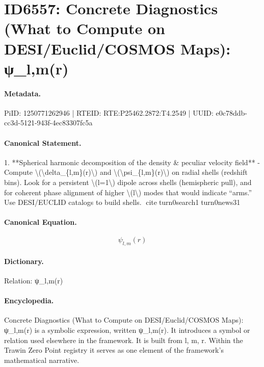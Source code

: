 \section*{ID6557: Concrete Diagnostics (What to Compute on DESI/Euclid/COSMOS Maps): ψ\_l,m(r)}
\paragraph{Metadata.}
PiID: 1250771262946 | RTEID: RTE:P25462.2872:T4.2549 | UUID: e0c78ddb-cc3d-5121-943f-4ec83307fc5a

\paragraph{Canonical Statement.}
1. **Spherical harmonic decomposition of the density \& peculiar velocity field** - Compute \textbackslash{}(\textbackslash{}delta\_\{l,m\}(r)\textbackslash{}) and \textbackslash{}(\textbackslash{}psi\_\{l,m\}(r)\textbackslash{}) on radial shells (redshift bins). Look for a persistent \textbackslash{}(l=1\textbackslash{}) dipole across shells (hemispheric pull), and for coherent phase alignment of higher \textbackslash{}(l\textbackslash{}) modes that would indicate “arms.” Use DESI/EUCLID catalogs to build shells. citeturn0search1turn0news31

\paragraph{Canonical Equation.}
\[
\psi_{l,m}(r)
\]

\paragraph{Dictionary.}
Relation: ψ\_l,m(r)

\paragraph{Encyclopedia.}
Concrete Diagnostics (What to Compute on DESI/Euclid/COSMOS Maps): ψ\_l,m(r) is a symbolic expression, written ψ\_l,m(r). It introduces a symbol or relation used elsewhere in the framework. It is built from l, m, r. Within the Trawin Zero Point registry it serves as one element of the framework's mathematical narrative.
